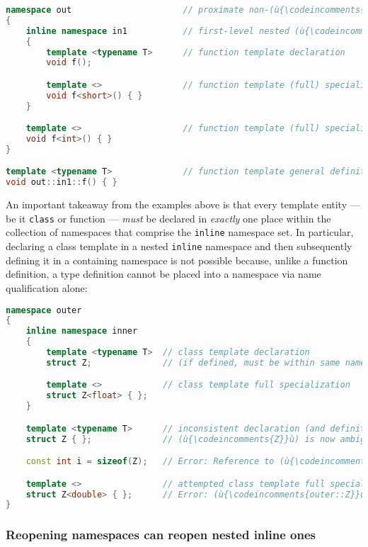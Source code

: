 \begin{lstlisting}[language=C++]
namespace out                      // proximate non-(ù{\codeincomments{inline}}ù) outer namespace
{
    inline namespace in1           // first-level nested (ù{\codeincomments{inline}}ù) namespace
    {
        template <typename T>      // function template declaration
        void f();

        template <>                // function template (full) specialization
        void f<short>() { }
    }

    template <>                    // function template (full) specialization
    void f<int>() { }
}

template <typename T>              // function template general definition
void out::in1::f() { }
\end{lstlisting}

\noindent An important takeaway from the examples above is that every template
entity --- be it \texttt{class} or function --- \emph{must} be declared
in \emph{exactly} one place within the collection of namespaces that
comprise the \texttt{inline} namespace set. In particular, declaring a
class template in a nested \texttt{inline} namespace and then
subsequently defining it in a containing namespace is not possible
because, unlike a function definition, a type definition cannot be
placed into a namespace via name qualification alone:

\begin{lstlisting}[language=C++]
namespace outer
{
    inline namespace inner
    {
        template <typename T>  // class template declaration
        struct Z;              // (if defined, must be within same namespace)

        template <>            // class template full specialization
        struct Z<float> { };
    }

    template <typename T>      // inconsistent declaration (and definition)
    struct Z { };              // (ù{\codeincomments{Z}}ù) is now ambiguous in namespace (ù{\codeincomments{outer}}ù).

    const int i = sizeof(Z);   // Error: Reference to (ù{\codeincomments{Z}}ù) is ambiguous.

    template <>                // attempted class template full specialization
    struct Z<double> { };      // Error: (ù{\codeincomments{outer::Z}}ù) or (ù{\codeincomments{outer::inner::Z}}ù)?
}
\end{lstlisting}


\subsubsection[Reopening namespaces can reopen nested {\tt inline} ones]{Reopening namespaces can reopen nested {\SubsubsecCode inline} ones}\label{reopening-namespaces-can-reopen-nested-inline-ones}

